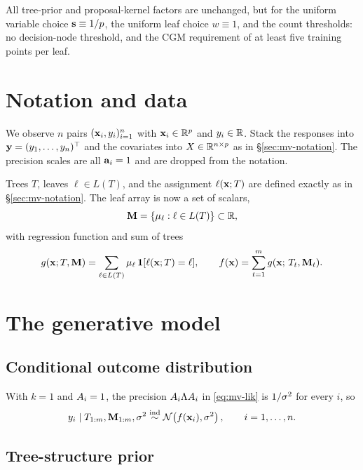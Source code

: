 All tree-prior and proposal-kernel factors are unchanged, but for the
uniform variable choice $\mathbf{s} \equiv 1/p$, the uniform leaf choice
$w \equiv 1$, and the count thresholds: no decision-node threshold, and the
CGM requirement of at least five training points per leaf.

\section{Notation and data}
\label{sec:notation}

We observe $n$ pairs $(\mathbf{x}_i, y_i)_{i=1}^n$ with $\mathbf{x}_i \in \mathbb{R}^p$ and
$y_i \in \mathbb{R}$. Stack the responses into $\mathbf{y} = (y_1, \dots, y_n)^\top$ and the
covariates into $X \in \mathbb{R}^{n \times p}$ as in \S\ref{sec:mv-notation}. The
precision scales are all $\mathbf{a}_i = 1$ and are dropped from the notation.

Trees $T$, leaves $\ell \in L(T)$, and the assignment $\ell(\mathbf{x}; T)$ are
defined exactly as in \S\ref{sec:mv-notation}. The leaf array is now a set
of scalars,
\[
	\mathbf{M} = \{ \mu_\ell : \ell \in L(T) \} \subset \mathbb{R},
\]
with regression function and sum of trees
\begin{equation}
	\label{eq:sum-of-trees}
	g(\mathbf{x}; T, \mathbf{M}) = \sum_{\ell \in L(T)} \mu_\ell\, \mathbf{1}[\ell(\mathbf{x}; T) = \ell],
	\qquad
	f(\mathbf{x}) = \sum_{t=1}^m g(\mathbf{x};\, T_t, \mathbf{M}_t).
\end{equation}

\section{The generative model}
\label{sec:model}

\subsection{Conditional outcome distribution}

With $k = 1$ and $A_i = 1$, the precision $A_i\Lambda A_i$ in
\eqref{eq:mv-lik} is $1/\sigma^{2}$ for every $i$, so
\begin{equation}
	\label{eq:lik}
	y_i \mid T_{1:m}, \mathbf{M}_{1:m}, \sigma^{2} \stackrel{\text{ind}}{\sim}
	\mathcal{N}\!\left(f(\mathbf{x}_i), \sigma^{2}\right),
	\qquad i = 1, \dots, n.
\end{equation}

\subsection{Tree-structure prior}

